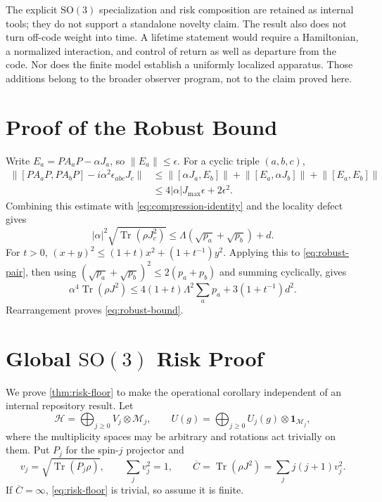 \documentclass[11pt]{article}
\theoremstyle{remark}
\newcommand{\cH}{\mathcal H}
\newcommand{\1}{\mathbf 1}
\newcommand{\Tr}{\operatorname{Tr}}
\newcommand{\SO}{\mathrm{SO}(3)}
\begin{document}
The explicit $\SO$ specialization and risk composition are retained as
internal tools; they do not support a standalone novelty claim. The result
also does not turn off-code weight into time. A lifetime statement would
require a Hamiltonian, a normalized interaction, and control of return as well
as departure from the code. Nor does the finite model establish a uniformly
localized apparatus. Those additions belong to the broader observer program,
not to the claim proved here.

\appendix

\section{Proof of the Robust Bound}
\label{app:robust}

Write $E_a=P A_aP-\alpha J_a$, so $\lVert E_a\rVert\leq\epsilon$. For a
cyclic triple $(a,b,c)$,
\begin{align*}
  \bigl\lVert[P A_aP,P A_bP]-i\alpha^2\epsilon_{abc}J_c\bigr\rVert
  &\leq
  \lVert[\alpha J_a,E_b]\rVert
  +\lVert[E_a,\alpha J_b]\rVert
  +\lVert[E_a,E_b]\rVert\\
  &\leq4|\alpha|J_{\max}\epsilon+2\epsilon^2.
\end{align*}
Combining this estimate with \cref{eq:compression-identity} and the locality
defect gives
\begin{equation}
  |\alpha|^2\sqrt{\Tr(\rho J_c^2)}
  \leq\Lambda(\sqrt{p_a}+\sqrt{p_b})+d.
  \label{eq:robust-pair}
\end{equation}
For $t>0$, $(x+y)^2\leq(1+t)x^2+(1+t^{-1})y^2$. Applying this to
\cref{eq:robust-pair}, then using
$(\sqrt{p_a}+\sqrt{p_b})^2\leq2(p_a+p_b)$ and summing cyclically, gives
\[
  \alpha^4\Tr(\rho J^2)
  \leq4(1+t)\Lambda^2\sum_a p_a
     +3(1+t^{-1})d^2.
\]
Rearrangement proves \cref{eq:robust-bound}.

\section{Global $\mathrm{SO}(3)$ Risk Proof}
\label{app:risk}

We prove \cref{thm:risk-floor} to make the operational corollary independent
of an internal repository result. Let
\[
  \cH=\bigoplus_{j\geq0}V_j\otimes\mathcal M_j,
  \qquad
  U(g)=\bigoplus_{j\geq0}U_j(g)\otimes\1_{\mathcal M_j},
\]
where the multiplicity spaces may be arbitrary and rotations act trivially on
them. Put $P_j$ for the spin-$j$ projector and
\[
  v_j=\sqrt{\Tr(P_j\rho)},
  \qquad \sum_jv_j^2=1,
  \qquad \overline C=\Tr(\rho J^2)=\sum_jj(j+1)v_j^2.
\]
If $\overline C=\infty$, \cref{eq:risk-floor} is trivial, so assume it is
finite.
\end{document}
